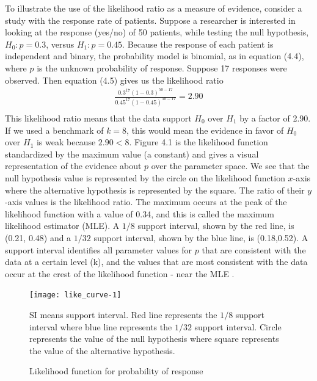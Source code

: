 \documentclass[12pt]{report}\usepackage[]{graphicx}\usepackage[]{color}
\newlength{\li}\setlength{\li}{14.48pt}
\newlength{\di}\setlength{\di}{-3.5mm}
\begin{document}
To illustrate the use of the likelihood ratio as a measure of evidence, consider a study with the response rate of patients. Suppose a researcher is interested in looking at the response (yes/no) of 50 patients, while testing the null hypothesis, $H_0: p = 0.3$, versus $H_1: p = 0.45$. Because the response of each patient is independent and binary, the probability model is binomial, as in equation (4.4), where $p$ is the unknown probability of response. Suppose 17 responses were observed. Then equation (4.5) gives us the likelihood ratio     
\begin{equation}
\begin{aligned}
\frac{0.3^{17}(1-0.3)^{50-17}}{0.45^{17}(1-0.45)^{50-17}} = 2.90 \\
\end{aligned}
\end{equation}
This likelihood ratio means that the data support $H_0$ over $H_1$ by a factor of 2.90. If we used a benchmark of $k=8$, this would mean the evidence in favor of $H_0$ over $H_1$ is weak because $2.90 < 8$. Figure 4.1 is the likelihood function standardized by the maximum value (a constant) and gives a visual representation of the evidence about $p$ over the parameter space.  We see that the null hypothesis value is represented by the circle on the likelihood function $x$-axis where the alternative hypothesis is represented by the square. The ratio of their $y$-axis values is the likelihood ratio. The maximum occurs at the peak of the likelihood function with a value of 0.34, and this is called the maximum likelihood estimator (MLE). A $1/8$ support interval, shown by the red line, is (0.21, 0.48) and a $1/32$ support interval, shown by the blue line, is (0.18,0.52). A support interval identifies all parameter values for $p$ that are consistent with the data at a certain level (k), and the values that are most consistent with the data occur at the crest of the likelihood function - near the MLE \cite{Blume2002}. 

\begin{figure}
\caption{Likelihood function for probability of response}
\begin{Schunk}


\centerline{\texttt{[image: like\_curve-1]} }

\end{Schunk}
\centering
\begin{minipage}{0.6\textwidth} %
{\scriptsize SI means support interval. Red line represents the $1/8$ support interval where blue line represents the $1/32$ support interval. Circle represents the value of the null hypothesis where square represents the value of the alternative hypothesis.\par}
\end{minipage}
\end{figure}
\end{document}
